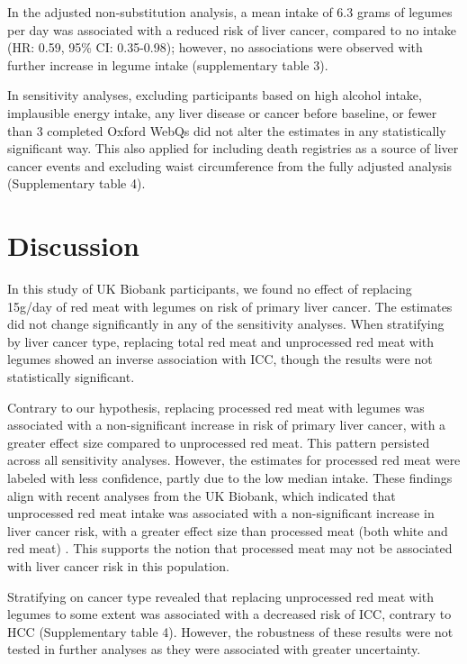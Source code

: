 \documentclass[sn-basic,Numbered,iicol,pdflatex]{sn-jnl}
\begin{document}
In the adjusted non-substitution analysis, a mean intake of 6.3 grams of
legumes per day was associated with a reduced risk of liver cancer,
compared to no intake
(HR: 0.59, 95\% CI: 0.35-0.98);
however, no associations were observed with further increase in legume
intake (supplementary table 3).

In sensitivity analyses, excluding participants based on high alcohol
intake, implausible energy intake, any liver disease or cancer before
baseline, or fewer than 3 completed Oxford WebQs did not alter the
estimates in any statistically significant way. This also applied for
including death registries as a source of liver cancer events and
excluding waist circumference from the fully adjusted analysis
(Supplementary table 4).

\hypertarget{sec4}{%
\section{Discussion}\label{sec4}}

In this study of UK Biobank participants, we found no effect of
replacing 15g/day of red meat with legumes on risk of primary liver
cancer. The estimates did not change significantly in any of the
sensitivity analyses. When stratifying by liver cancer type, replacing
total red meat and unprocessed red meat with legumes showed an inverse
association with ICC, though the results were not statistically
significant.

Contrary to our hypothesis, replacing processed red meat with legumes
was associated with a non-significant increase in risk of primary liver
cancer, with a greater effect size compared to unprocessed red meat.
This pattern persisted across all sensitivity analyses. However, the
estimates for processed red meat were labeled with less confidence,
partly due to the low median intake. These findings align with recent
analyses from the UK Biobank, which indicated that unprocessed red meat
intake was associated with a non-significant increase in liver cancer
risk, with a greater effect size than processed meat (both white and red
meat) \citep{Knuppel2020}. This supports the notion that processed meat may
not be associated with liver cancer risk in this population.

Stratifying on cancer type revealed that replacing unprocessed red meat
with legumes to some extent was associated with a decreased risk of ICC,
contrary to HCC (Supplementary table 4). However, the robustness of
these results were not tested in further analyses as they were
associated with greater uncertainty.
\end{document}
